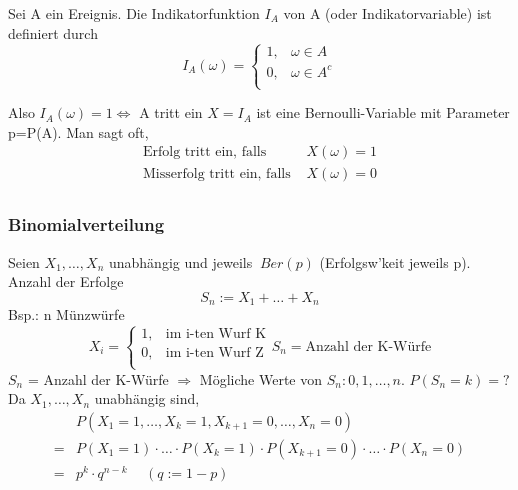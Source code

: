 \documentclass[a4paper,11pt]{article}
\begin{document}
\vspace{6pt}
\noindent Sei A ein Ereignis. Die Indikatorfunktion $I_A$ von A (oder Indikatorvariable) ist definiert durch
\begin{equation*}
    I_A(\omega)=\begin{cases}
        1, & \omega\in A\\
        0, & \omega\in A^c\\
    \end{cases}
\end{equation*}

\noindent Also
\newline $I_A(\omega)=1 \Leftrightarrow$ A tritt ein
\newline $X=I_A$ ist eine Bernoulli-Variable mit Parameter p=P(A).
\newline Man sagt oft, 
\begin{align*}
    \text{Erfolg tritt ein, falls } & X(\omega)=1\\
    \text{Misserfolg tritt ein, falls } & X(\omega)=0\\
\end{align*}


\subsubsection{Binomialverteilung}
\noindent Seien $X_1,\dots,X_n$ unabhängig und jeweils $~Ber(p)$ (Erfolgsw'keit jeweils p).
\newline Anzahl der Erfolge 
\[S_n:= X_1+\dots+X_n\]
Bsp.: n Münzwürfe
\begin{equation*}
    X_i=\begin{cases}
        1, & \text{im i-ten Wurf K}\\
        0, & \text{im i-ten Wurf Z}\\
    \end{cases}
    S_n = \text{Anzahl der K-Würfe}
\end{equation*}
$S_n$ = Anzahl der K-Würfe $\Rightarrow$ Mögliche Werte von $S_n:0,1,\dots,n.$ $P(S_n=k)=?$
\newline Da $X_1,\dots,X_n$ unabhängig sind, 
\begin{align*}
   & P(X_1=1,\dots,X_k=1, X_{k+1}=0,\dots,X_n=0)\\
   =& P(X_1=1)\cdot\dots\cdot P(X_k=1)\cdot P(X_{k+1}=0)\cdot\dots\cdot P(X_n=0)\\
   =& p^k \cdot q^{n-k} \hspace{15pt} (q:=1-p)
\end{align*}
\end{document}
